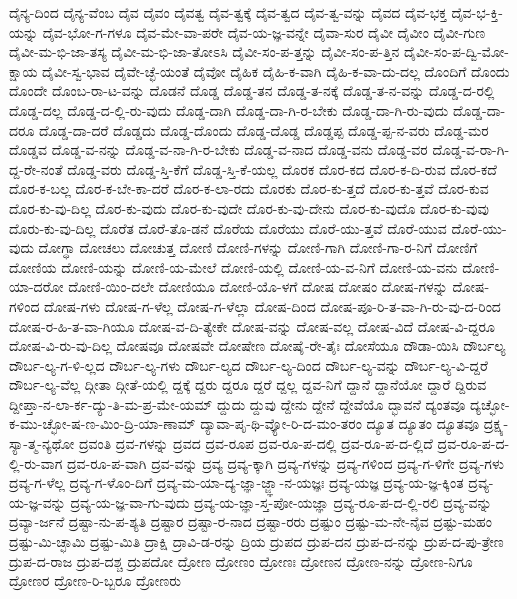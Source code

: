 {ದೈನ್ಯ-ದಿಂದ
ದೈನ್ಯ-ವೆಂಬ
ದೈವ
ದೈವಂ
ದೈವತ್ವ
ದೈವ-ತ್ವಕ್ಕೆ
ದೈವ-ತ್ವದ
ದೈವ-ತ್ವ-ವನ್ನು
ದೈವದ
ದೈವ-ಭಕ್ತ
ದೈವ-ಭ-ಕ್ತಿ-ಯನ್ನು
ದೈವ-ಭೋ-ಗ-ಗಳೂ
ದೈವ-ಮೇ-ವಾ-ಪರೇ
ದೈವ-ಯ-ಜ್ಞ-ವನ್ನೇ
ದೈವಾ-ಸುರ
ದೈವೀ
ದೈವೀಂ
ದೈವೀ-ಗುಣ
ದೈವೀ-ಮ-ಭಿ-ಜಾ-ತಸ್ಯ
ದೈವೀ-ಮ-ಭಿ-ಜಾ-ತೋಽಸಿ
ದೈವೀ-ಸಂ-ಪ-ತ್ತನ್ನು
ದೈವೀ-ಸಂ-ಪ-ತ್ತಿನ
ದೈವೀ-ಸಂ-ಪ-ದ್ವಿ-ಮೋ-ಕ್ಷಾಯ
ದೈವೀ-ಸ್ವ-ಭಾವ
ದೈವೇ-ಚ್ಛೆ-ಯಂತೆ
ದೈವೋ
ದೈಹಿಕ
ದೈಹಿ-ಕ-ವಾಗಿ
ದೈಹಿ-ಕ-ವಾ-ದು-ದಲ್ಲ
ದೊಂದಿಗೆ
ದೊಂದು
ದೊಂದೇ
ದೊಂಬ-ರಾ-ಟ-ವನ್ನು
ದೊಡನೆ
ದೊಡ್ಡ
ದೊಡ್ಡ-ತನ
ದೊಡ್ಡ-ತ-ನಕ್ಕೆ
ದೊಡ್ಡ-ತ-ನ-ವನ್ನು
ದೊಡ್ಡ-ದ-ರಲ್ಲಿ
ದೊಡ್ಡ-ದಲ್ಲ
ದೊಡ್ಡ-ದ-ಲ್ಲಿ-ರು-ವುದು
ದೊಡ್ಡ-ದಾಗಿ
ದೊಡ್ಡ-ದಾ-ಗಿ-ರ-ಬೇಕು
ದೊಡ್ಡ-ದಾ-ಗಿ-ರು-ವುದು
ದೊಡ್ಡ-ದಾ-ದರೂ
ದೊಡ್ಡ-ದಾ-ದರೆ
ದೊಡ್ಡದು
ದೊಡ್ಡ-ದೊಂದು
ದೊಡ್ಡ-ದೊಡ್ಡ
ದೊಡ್ಡಪ್ಪ
ದೊಡ್ಡ-ಪ್ಪ-ನ-ವರು
ದೊಡ್ಡ-ಮರ
ದೊಡ್ಡವ
ದೊಡ್ಡ-ವ-ನನ್ನು
ದೊಡ್ಡ-ವ-ನಾ-ಗಿ-ರ-ಬೇಕು
ದೊಡ್ಡ-ವ-ನಾದ
ದೊಡ್ಡ-ವನು
ದೊಡ್ಡ-ವರ
ದೊಡ್ಡ-ವ-ರಾ-ಗಿ-ದ್ದ-ರೇ-ನಂತೆ
ದೊಡ್ಡ-ವರು
ದೊಡ್ಡ-ಸ್ತಿ-ಕೆಗೆ
ದೊಡ್ಡ-ಸ್ತಿ-ಕೆ-ಯಲ್ಲ
ದೊರಕ
ದೊರ-ಕದ
ದೊರ-ಕ-ದಿ-ರುವ
ದೊರ-ಕದೆ
ದೊರ-ಕ-ಬಲ್ಲ
ದೊರ-ಕ-ಬೇ-ಕಾ-ದರೆ
ದೊರ-ಕ-ಲಾ-ರದು
ದೊರಕು
ದೊರ-ಕು-ತ್ತದೆ
ದೊರ-ಕು-ತ್ತವೆ
ದೊರ-ಕುವ
ದೊರ-ಕು-ವು-ದಿಲ್ಲ
ದೊರ-ಕು-ವುದು
ದೊರ-ಕು-ವುದೇ
ದೊರ-ಕು-ವು-ದೇನು
ದೊರ-ಕು-ವುದೊ
ದೊರ-ಕು-ವುವು
ದೊರು-ಕು-ವು-ದಿಲ್ಲ
ದೊರೆತ
ದೊರೆ-ತೊ-ಡನೆ
ದೊರೆಯ
ದೊರೆಯು
ದೊರೆ-ಯು-ತ್ತವೆ
ದೊರೆ-ಯುವ
ದೊರೆ-ಯು-ವುದು
ದೋಗ್ಧಾ
ದೋಚಲು
ದೋಚುತ್ತ
ದೋಣಿ
ದೋಣಿ-ಗಳನ್ನು
ದೋಣಿ-ಗಾಗಿ
ದೋಣಿ-ಗಾ-ರ-ನಿಗೆ
ದೋಣಿಗೆ
ದೋಣಿಯ
ದೋಣಿ-ಯನ್ನು
ದೋಣಿ-ಯ-ಮೇಲೆ
ದೋಣಿ-ಯಲ್ಲಿ
ದೋಣಿ-ಯ-ವ-ನಿಗೆ
ದೋಣಿ-ಯ-ವನು
ದೋಣಿ-ಯಾ-ದರೋ
ದೋಣಿ-ಯಿಂ-ದಲೇ
ದೋಣಿಯೂ
ದೋಣಿ-ಯೊ-ಳಗೆ
ದೋಷ
ದೋಷಂ
ದೋಷ-ಗಳನ್ನು
ದೋಷ-ಗಳಿಂದ
ದೋಷ-ಗಳು
ದೋಷ-ಗ-ಳೆಲ್ಲ
ದೋಷ-ಗ-ಳೆಲ್ಲಾ
ದೋಷ-ದಿಂದ
ದೋಷ-ಪೂ-ರಿ-ತ-ವಾ-ಗಿ-ರು-ವು-ದ-ರಿಂದ
ದೋಷ-ರ-ಹಿ-ತ-ವಾ-ಗಿಯೂ
ದೋಷ-ವ-ದಿ-ತ್ಯೇಕೇ
ದೋಷ-ವನ್ನು
ದೋಷ-ವಲ್ಲ
ದೋಷ-ವಿದೆ
ದೋಷ-ವಿ-ದ್ದರೂ
ದೋಷ-ವಿ-ರು-ವು-ದಿಲ್ಲ
ದೋಷವೂ
ದೋಷವೇ
ದೋಷೇಣ
ದೋಷೈ-ರೇ-ತೈಃ
ದೋಸೆಯೂ
ದೌಡಾ-ಯಿಸಿ
ದೌರ್ಬಲ್ಯ
ದೌರ್ಬ-ಲ್ಯ-ಗ-ಳಿ-ಲ್ಲದ
ದೌರ್ಬ-ಲ್ಯ-ಗಳು
ದೌರ್ಬ-ಲ್ಯದ
ದೌರ್ಬ-ಲ್ಯ-ದಿಂದ
ದೌರ್ಬ-ಲ್ಯ-ವನ್ನು
ದೌರ್ಬ-ಲ್ಯ-ವಿ-ದ್ದರೆ
ದೌರ್ಬ-ಲ್ಯ-ವೆಲ್ಲ
ದ್ಗೀತಾ
ದ್ಗೀತೆ-ಯಲ್ಲಿ
ದ್ದಕ್ಕೆ
ದ್ದರು
ದ್ದರೂ
ದ್ದರೆ
ದ್ದಲ್ಲ
ದ್ದವ-ನಿಗೆ
ದ್ದಾನೆ
ದ್ದಾನೆಯೋ
ದ್ದಾರೆ
ದ್ದಿರುವ
ದ್ದೀಪ್ತಾ-ನ-ಲಾ-ರ್ಕ-ದ್ಯು-ತಿ-ಮ-ಪ್ರ-ಮೇ-ಯಮ್
ದ್ದುದು
ದ್ದುವು
ದ್ದೇನು
ದ್ದೇನೆ
ದ್ದೇವೆಯೊ
ದ್ಭಾವನೆ
ದ್ಯಂತವೂ
ದ್ಯಚ್ಛೋ-ಕ-ಮು-ಚ್ಛೋ-ಷ-ಣ-ಮಿಂ-ದ್ರಿ-ಯಾ-ಣಾಮ್
ದ್ಯಾವಾ-ಪೃ-ಥಿ-ವ್ಯೋ-ರಿ-ದ-ಮಂ-ತರಂ
ದ್ಯೂತ
ದ್ಯೂತಂ
ದ್ಯೂತವೂ
ದ್ರಕ್ಷ್ಯ-ಸ್ಯಾ-ತ್ಮ-ನ್ಯಥೋ
ದ್ರವಂತಿ
ದ್ರವ-ಗಳನ್ನು
ದ್ರವದ
ದ್ರವ-ರೂಪ
ದ್ರವ-ರೂ-ಪ-ದಲ್ಲಿ
ದ್ರವ-ರೂ-ಪ-ದ-ಲ್ಲಿದೆ
ದ್ರವ-ರೂ-ಪ-ದ-ಲ್ಲಿ-ರು-ವಾಗ
ದ್ರವ-ರೂ-ಪ-ವಾಗಿ
ದ್ರವ-ವನ್ನು
ದ್ರವ್ಯ
ದ್ರವ್ಯ-ಕ್ಕಾಗಿ
ದ್ರವ್ಯ-ಗಳನ್ನು
ದ್ರವ್ಯ-ಗಳಿಂದ
ದ್ರವ್ಯ-ಗ-ಳಿಗೇ
ದ್ರವ್ಯ-ಗಳು
ದ್ರವ್ಯ-ಗ-ಳೆಲ್ಲ
ದ್ರವ್ಯ-ಗ-ಳೊಂ-ದಿಗೆ
ದ್ರವ್ಯ-ಮ-ಯಾ-ದ್ಯ-ಜ್ಞಾ-ಜ್ಜ್ಞಾ-ನ-ಯಜ್ಞಃ
ದ್ರವ್ಯ-ಯಜ್ಞ
ದ್ರವ್ಯ-ಯ-ಜ್ಞ-ಕ್ಕಿಂತ
ದ್ರವ್ಯ-ಯ-ಜ್ಞ-ವನ್ನು
ದ್ರವ್ಯ-ಯ-ಜ್ಞ-ವಾ-ಗು-ವುದು
ದ್ರವ್ಯ-ಯ-ಜ್ಞಾ-ಸ್ತ-ಪೋ-ಯಜ್ಞಾ
ದ್ರವ್ಯ-ರೂ-ಪ-ದ-ಲ್ಲಿ-ರಲಿ
ದ್ರವ್ಯ-ವನ್ನು
ದ್ರವ್ಯಾ-ರ್ಜನೆ
ದ್ರಷ್ಟಾ-ನು-ಪ-ಶ್ಯತಿ
ದ್ರಷ್ಟಾರ
ದ್ರಷ್ಟಾ-ರ-ನಾದ
ದ್ರಷ್ಟಾ-ರರು
ದ್ರಷ್ಟುಂ
ದ್ರಷ್ಟು-ಮ-ನೇ-ನೈವ
ದ್ರಷ್ಟು-ಮಹಂ
ದ್ರಷ್ಟು-ಮಿ-ಚ್ಛಾಮಿ
ದ್ರಷ್ಟು-ಮಿತಿ
ದ್ರಾಕ್ಷಿ
ದ್ರಾವಿ-ಡ-ರನ್ನು
ದ್ರಿಯ
ದ್ರುಪದ
ದ್ರುಪ-ದನ
ದ್ರುಪ-ದ-ನನ್ನು
ದ್ರುಪ-ದ-ಪು-ತ್ರೇಣ
ದ್ರುಪ-ದ-ರಾಜ
ದ್ರುಪ-ದಶ್ಚ
ದ್ರುಪದೋ
ದ್ರೋಣ
ದ್ರೋಣಂ
ದ್ರೋಣಃ
ದ್ರೋಣನ
ದ್ರೋಣ-ನನ್ನು
ದ್ರೋಣ-ನಿಗೂ
ದ್ರೋಣರ
ದ್ರೋಣ-ರಿ-ಬ್ಬರೂ
ದ್ರೋಣರು
}
